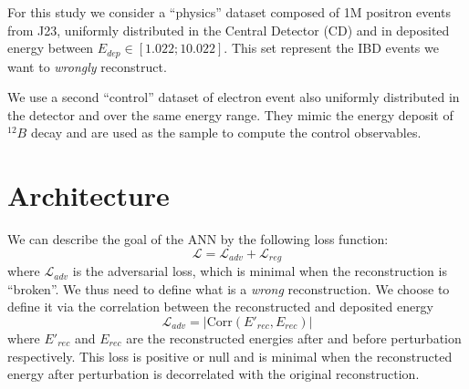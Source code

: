\documentclass[../main.tex]{subfiles}
\begin{document}
For this study we consider a ``physics'' dataset composed of 1M positron events from J23, uniformly distributed in the Central Detector (CD) and in deposited energy between $E_{dep} \in [1.022; 10.022]$. This set represent the IBD events we want to \textit{wrongly} reconstruct.

We use a second ``control'' dataset of electron event also uniformly distributed in the detector and over the same energy range. They mimic the energy deposit of $^{12}B$ decay and are used as the sample to compute the control observables.

\section{Architecture}
\label{sec:janne:arch}
We can describe the goal of the ANN by the following loss function:
\begin{equation}
  \label{eq:janne:loss}
  \mathcal{L} = \mathcal{L}_{adv} + \mathcal{L}_{reg}
\end{equation}
where $\mathcal{L}_{adv}$ is the adversarial loss, which is minimal when the reconstruction is ``broken''. We thus need to define what is a \textit{wrong} reconstruction. We choose to define it via the correlation between the reconstructed and deposited energy
\begin{equation}
  \label{eq:janne:ladv}
  \mathcal{L}_{adv} = |\mathrm{Corr}(E'_{rec}, E_{rec})|
\end{equation}
where $E'_{rec}$ and $E_{rec}$ are the reconstructed energies after and before perturbation respectively.
This loss is positive or null and is minimal when the reconstructed energy after perturbation is decorrelated with the original reconstruction.
\end{document}
